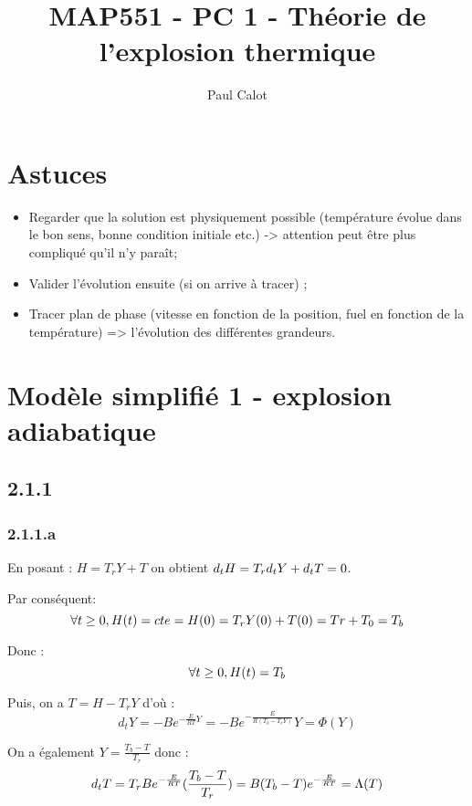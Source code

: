 \documentclass[10pt,a4paper,twocolumn]{article}
\author{Paul Calot}
\title{MAP551 - PC 1 - Théorie de l’explosion thermique}
\begin{document}
\maketitle


\section{Astuces}

\begin{itemize}
 \item Regarder que la solution est physiquement possible (température évolue dans le bon sens, bonne condition initiale etc.) -> attention peut être plus compliqué qu'il n'y paraît;
 \item Valider l'évolution ensuite (si on arrive à tracer) ;
 \item Tracer plan de phase (vitesse en fonction de la position, fuel en fonction de la température) => l'évolution des différentes grandeurs.
\end{itemize}

\section{Modèle simplifié 1 - explosion adiabatique}

\subsection{2.1.1}

\subsubsection{2.1.1.a}

En posant : $ H = T_r Y + T $ on obtient $d_tH = T_r \space d_tY+d_tT = 0$. 

Par conséquent:  $$\forall t \geq 0, \space H(t) = cte = H(0) = T_r Y(0) + T(0) = Tr + T_0 = T_b $$

Donc : $$\forall t \geq 0, \space H(t) = T_b$$

Puis, on a $T= H-T_rY$ d'où : 
$$ d_tY = -B e^{-\frac{E}{RT}Y} = -B e^{-\frac{E}{R(T_b-T_rY)}} Y = \Phi(Y)$$

On a également $Y= \frac{T_b-T}{T_r}$ donc : 
$$ d_tT = T_r \space B e^{-\frac{E}{RT}} (\frac{T_b-T}{T_r}) = B \space (T_b-T) e^{-\frac{E}{RT}}  = \Lambda(T)$$
\end{document}
